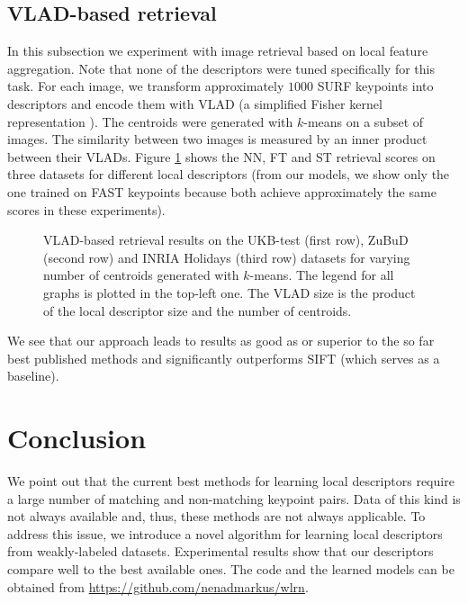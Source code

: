 \documentclass[10pt,conference,a4paper]{IEEEtran}
\begin{document}
		\subsection{VLAD-based retrieval}
			In this subsection we experiment with image retrieval based on local feature aggregation.
			Note that none of the descriptors were tuned specifically for this task.
			For each image, we transform approximately $1000$ SURF \cite{surf} keypoints into descriptors and encode them with VLAD \cite{vlad} (a simplified Fisher kernel representation \cite{fisherkernel}).
			The centroids were generated with $k$-means on a subset of images.
			The similarity between two images is measured by an inner product between their VLADs.
			Figure \ref{fig:vlad} shows the NN, FT and ST retrieval scores on three datasets for different local descriptors
			(from our models, we show only the one trained on FAST keypoints because both achieve approximately the same scores in these experiments).
			\begin{figure}[ht]
				\centering
				\resizebox{1.99\columnwidth}{!}
				{
					
				}
				\resizebox{1.99\columnwidth}{!}
				{
					
				}
				\resizebox{1.99\columnwidth}{!}
				{
					
				}
				\caption
				{
					VLAD-based retrieval results on the UKB-test (first row), ZuBuD (second row) and INRIA Holidays (third row) datasets for varying number of centroids generated with $k$-means.
					The legend for all graphs is plotted in the top-left one.
					The VLAD size is the product of the local descriptor size and the number of centroids.
				}
				\label{fig:vlad}
			\end{figure}
			We see that our approach leads to results as good as or superior to the so far best published methods and significantly outperforms SIFT (which serves as a baseline).

	\section{Conclusion}
		We point out that the current best methods for learning local descriptors require a large number of matching and non-matching keypoint pairs.
		Data of this kind is not always available and, thus, these methods are not always applicable.
		To address this issue, we introduce a novel algorithm for learning local descriptors from weakly-labeled datasets.
		Experimental results show that our descriptors compare well to the best available ones.
		The code and the learned models can be obtained from \url{https://github.com/nenadmarkus/wlrn}. %
\end{document}
